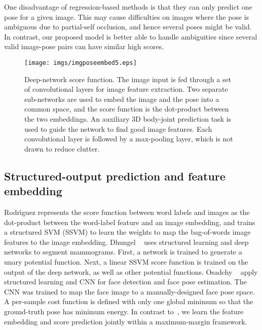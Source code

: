 \documentclass[10pt,twocolumn,letterpaper]{article}
\begin{document}
One disadvantage of regression-based methods is that they can only predict one pose for a given image.  This may cause difficulties on images where the pose is ambiguous due to partial-self occlusion, and hence several poses might be valid.
In contrast, our proposed model is better able to handle ambiguities since several valid image-pose pairs can have similar high scores.
 
\begin{figure*}[t]
\begin{center}  
\texttt{[image: imgs/imgposeembed5.eps]}
\end{center}
\vspace{-0.1in}
   \caption{Deep-network score function.  The image input is fed through a set of convolutional layers for image feature extraction. Two separate sub-networks are used to embed the image and the pose into a common space, and the score function is the dot-product between the two embeddings.
An auxiliary 3D body-joint prediction task is used to guide the network to find good image features.
Each convolutional layer is followed by a max-pooling layer, which is not drawn to reduce clutter.}
\label{fig:imgposenet}
\vspace{-0.15in}
\end{figure*} 
 

   
\subsection{Structured-output prediction and feature embedding}
Rodr{\'{\i}}guez \cite{labelembed2013}
represents the score function between word labels and images as the dot-product between the word-label feature and an image embedding, and trains a structured SVM (SSVM) to learn the weights to map the bag-of-words image features to the image embedding.
Dhungel \etal~\cite{DhungelCB14} uses structured learning and deep networks to segment mammograms.  First, a network is trained to generate a unary potential function.
Next, a linear SSVM score function is trained on the output of the deep network, as well as other potential functions. 
Osadchy \etal~\cite{Osadchy:2007} apply structured learning and CNN for face detection and face pose estimation. 
The CNN was trained to map the face image to a manually-designed face pose space. A per-sample cost function is defined with only one global minimum so that the ground-truth pose has minimum energy.
In contrast to~\cite{DhungelCB14,labelembed2013,Osadchy:2007}, we learn the feature embedding and score prediction jointly within a maximum-margin framework. 
  
\end{document}
